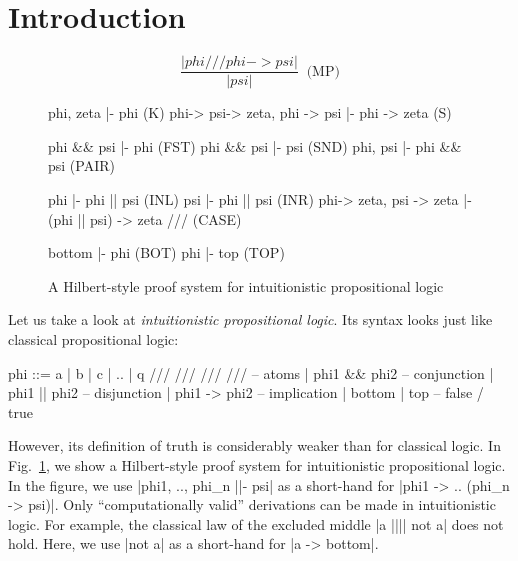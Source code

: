 \documentclass{llncs}
\begin{document}
\section{Introduction}

\begin{figure}[t]
\begin{center}
$$
\frac{|phi /// phi -> psi|}{|psi|}\;\;\mbox{(MP)}
$$
\begin{code}
                      phi, zeta    |- phi                       (K)
phi->   psi-> zeta,   phi ->  psi  |- phi -> zeta               (S)

                      phi && psi   |- phi                       (FST)
                      phi && psi   |- psi                       (SND)
                      phi, psi     |- phi && psi                (PAIR)

                      phi          |- phi || psi                (INL)
                      psi          |- phi || psi                (INR)
        phi-> zeta,   psi -> zeta  |- (phi || psi) -> zeta ///  (CASE)

                      bottom       |- phi                       (BOT)
                      phi          |- top                       (TOP)
\end{code}
\vspace{-0.7cm}\end{center}
\label{fig:hilbert}
\caption{A Hilbert-style proof system for intuitionistic propositional logic}
\end{figure}

Let us take a look at {\em intuitionistic propositional logic}. Its syntax looks just like classical propositional logic:
\begin{code}
phi  ::=  a | b | c | .. | q /// /// /// ///  -- atoms
     |    phi1 && phi2                        -- conjunction
     |    phi1 || phi2                        -- disjunction
     |    phi1 -> phi2                        -- implication
     |    bottom | top                        -- false / true
\end{code}
However, its definition of truth is considerably weaker than for classical logic. In Fig.\ \ref{fig:hilbert}, we show a Hilbert-style proof system for intuitionistic propositional logic. In the figure, we use |phi1, .., phi_n ||- psi| as a short-hand for |phi1 -> .. (phi_n -> psi)|. Only ``computationally valid'' derivations can be made in intuitionistic logic. For example, the classical law of the excluded middle |a |||| not a| does not hold. Here, we use |not a| as a short-hand for |a -> bottom|.
\end{document}
